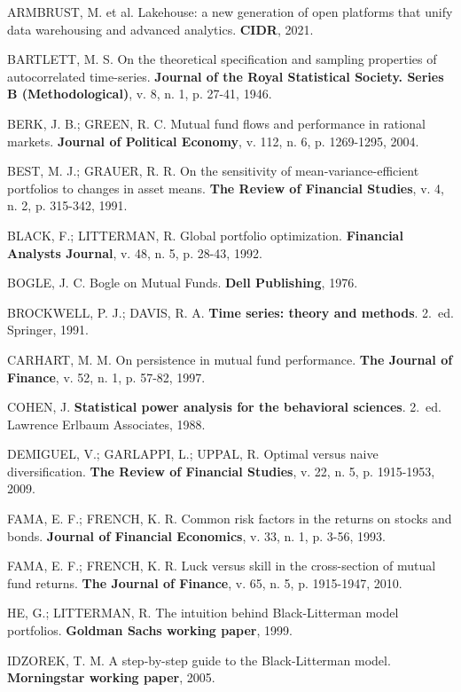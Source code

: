 \documentclass[12pt,a4paper,oneside]{article}
\begin{document}
\begin{singlespace}\small

\noindent ARMBRUST, M. et al. Lakehouse: a new generation of open platforms
that unify data warehousing and advanced analytics. \textbf{CIDR}, 2021.

\noindent BARTLETT, M. S. On the theoretical specification and sampling
properties of autocorrelated time-series. \textbf{Journal of the Royal
Statistical Society. Series B (Methodological)}, v. 8, n. 1, p. 27-41, 1946.

\noindent BERK, J. B.; GREEN, R. C. Mutual fund flows and performance in
rational markets. \textbf{Journal of Political Economy}, v. 112, n. 6,
p. 1269-1295, 2004.

\noindent BEST, M. J.; GRAUER, R. R. On the sensitivity of mean-variance-efficient
portfolios to changes in asset means. \textbf{The Review of Financial Studies},
v. 4, n. 2, p. 315-342, 1991.

\noindent BLACK, F.; LITTERMAN, R. Global portfolio optimization.
\textbf{Financial Analysts Journal}, v. 48, n. 5, p. 28-43, 1992.

\noindent BOGLE, J. C. Bogle on Mutual Funds. \textbf{Dell Publishing}, 1976.

\noindent BROCKWELL, P. J.; DAVIS, R. A. \textbf{Time series: theory and
methods}. 2.~ed. Springer, 1991.

\noindent CARHART, M. M. On persistence in mutual fund performance.
\textbf{The Journal of Finance}, v. 52, n. 1, p. 57-82, 1997.

\noindent COHEN, J. \textbf{Statistical power analysis for the behavioral
sciences}. 2.~ed. Lawrence Erlbaum Associates, 1988.

\noindent DEMIGUEL, V.; GARLAPPI, L.; UPPAL, R. Optimal versus naive
diversification. \textbf{The Review of Financial Studies}, v. 22, n. 5,
p. 1915-1953, 2009.

\noindent FAMA, E. F.; FRENCH, K. R. Common risk factors in the returns on
stocks and bonds. \textbf{Journal of Financial Economics}, v. 33, n. 1,
p. 3-56, 1993.

\noindent FAMA, E. F.; FRENCH, K. R. Luck versus skill in the cross-section
of mutual fund returns. \textbf{The Journal of Finance}, v. 65, n. 5,
p. 1915-1947, 2010.

\noindent HE, G.; LITTERMAN, R. The intuition behind Black-Litterman model
portfolios. \textbf{Goldman Sachs working paper}, 1999.

\noindent IDZOREK, T. M. A step-by-step guide to the Black-Litterman model.
\textbf{Morningstar working paper}, 2005.


\end{singlespace}
\end{document}
